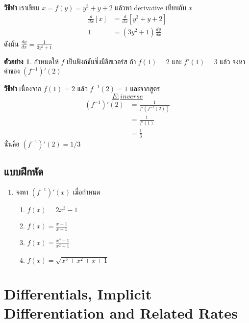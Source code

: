 \documentclass[
]{book}
\theoremstyle{definition}
\theoremstyle{definition}
\newtheorem{example}{ตัวอย่าง}[chapter]
\theoremstyle{definition}
\theoremstyle{definition}
\theoremstyle{remark}
\begin{document}
\textbf{วิธีทำ} เราเขียน \(x = f(y) = y^3+y+2\) แล้วหา derivative เทียบกับ \(x\)
\begin{equation}   \begin{aligned}
    \frac{d}{dx}[x]  &= \frac{d}{dx}[y^3+y+2] \\
    1 &= (3y^2+1)\frac{dy}{dx}
  \end{aligned} \end{equation} ดังนั้น \(\displaystyle \frac{dy}{dx} = \frac{1}{3y^2+1}\)

\begin{example}
กำหนดให้ \(f\) เป็นฟังก์ชันซึ่งมีอิสเวอร์ส ถ้า \(f(1) = 2\) และ \(f'(1) = 3\) แล้ว
จงหาค่าของ \((f^{-1})'(2)\)
\end{example}

\textbf{วิธีทำ} เนื่องจาก \(f(1) = 2\) แล้ว \(f^{-1}(2) = 1\) และจากสูตร
~\hyperref[E:inverse]{\[E:inverse\]} \begin{equation}   \begin{aligned}
    (f^{-1})'(2)
    &= \frac{1}{f'(f^{-1}(2))} \\
    &= \frac{1}{f'(1)} \\
    &= \frac{1}{3}
  \end{aligned} \end{equation} นั่นคือ \(\displaystyle (f^{-1})'(2) = 1/3\)

\subsection{แบบฝึกหัด}\label{uxe41uxe1auxe1auxe1duxe01uxe2buxe14-1}

\begin{enumerate}
\def\labelenumi{\arabic{enumi}.}
\item
  จงหา \((f^{-1})'(x)\) เมื่อกำหนด

  \begin{enumerate}
  \def\labelenumii{\arabic{enumii}.}
  \item
    \(\displaystyle f(x) =  2x^3-1\)
  \item
    \(\displaystyle f(x) = \frac{x+1}{x-1}\)
  \item
    \(\displaystyle f(x) = \frac{x^3+1}{x^2+1}\)
  \item
    \(\displaystyle f(x) = \sqrt{x^3+x^2+x+1}\)
  \end{enumerate}
\end{enumerate}

\section{Differentials, Implicit Differentiation and Related Rates}\label{differentials-implicit-differentiation-and-related-rates}
\end{document}
